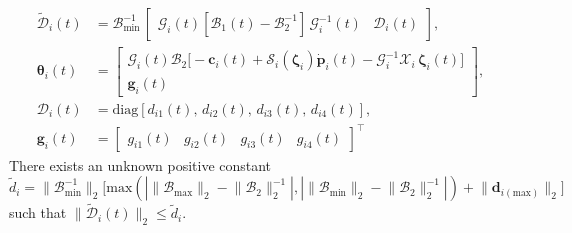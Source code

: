 \documentclass[lettersize,journal]{IEEEtran}
\begin{document}
\begin{align*}
    \tilde{\mathcal{D}}_i(t) &= \mathcal{B}_{\text{min}}^{-1} \, \begin{bmatrix} \mathcal{G}_i(t) \left[ \mathcal{B}_1(t) - \mathcal{B}_{2}^{-1} \right] \, \mathcal{G}_i^{-1}(t)& \mathcal{D}_i(t) \end{bmatrix}, \\
    \boldsymbol{\theta}_i(t) &= \begin{bmatrix}
    \mathcal{G}_i(t) \mathcal{B}_{2} \big[- \boldsymbol{c}_i(t) + \mathcal{S}_i(\boldsymbol{\zeta}_i) \dot{\boldsymbol{p}}_i(t) - \mathcal{G}_{i}^{-1} \mathcal{X}_i\,\boldsymbol{\zeta}_i(t) \big] \\ \boldsymbol{g}_i(t)
    \end{bmatrix}, \\
    \mathcal{D}_i(t) &= \text{diag}[d_{i 1}(t), \, d_{i 2}(t), \, d_{i 3}(t), \, d_{i 4}(t)], \\
    \boldsymbol{g}_i(t) &= \begin{bmatrix} g_{i 1}(t) & g_{i 2}(t) & g_{i 3}(t) & g_{i 4}(t) \end{bmatrix}^{\top}
\end{align*}
There exists an unknown positive constant $\tilde{d}_i = \lVert \mathcal{B}_{\text{min}}^{-1} \rVert_2 \Big[\text{max}\left(|\lVert \mathcal{B}_{\text{max}} \rVert_2 - \lVert \mathcal{B}_{2} \rVert_2^{-1}|,|\lVert \mathcal{B}_{\text{min}} \rVert_2 - \lVert \mathcal{B}_{2} \rVert_2^{-1}|\right) + \lVert \boldsymbol{d}_{i(\text{max})} \rVert_2 \Big]$ such that $\lVert\tilde{\mathcal{D}}_i(t)\rVert_2\leq\tilde{d}_i$.
 
\end{document}
